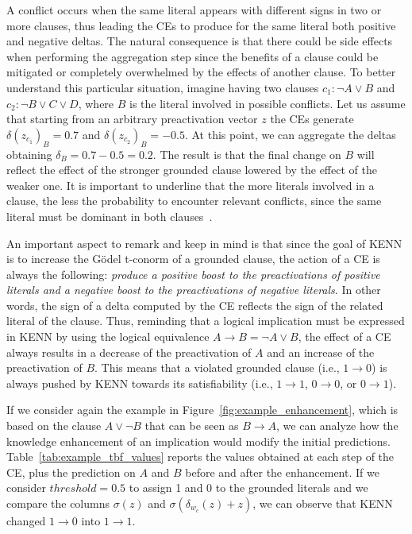 A conflict occurs when the same literal appears with different signs in two or more clauses, thus leading the CEs to produce for the same literal both positive and negative deltas. The natural consequence is that there could be side effects when performing the aggregation step since the benefits of a clause could be mitigated or completely overwhelmed by the effects of another clause. To better understand this particular situation, imagine having two clauses $ c_{1}: \neg A \vee B $ and $ c_{2}: \neg B \vee C \vee D $, where $B$ is the literal involved in possible conflicts. Let us assume that starting from an arbitrary preactivation vector $ z $ the CEs generate $ \delta (z_{c_{1}})_{B} = 0.7 $ and $ \delta (z_{c_{2}})_{B} = -0.5 $. At this point, we can aggregate the deltas obtaining $\delta _{B} = 0.7 - 0.5 = 0.2$. The result is that the final change on $ B $ will reflect the effect of the stronger grounded clause lowered by the effect of the weaker one. It is important to underline that the more literals involved in a clause, the less the probability to encounter relevant conflicts, since the same literal must be dominant in both clauses~\cite{kenn}.

An important aspect to remark and keep in mind is that since the goal of KENN is to increase the Gödel t-conorm of a grounded clause, the action of a CE is always the following: \textit{produce a positive boost to the preactivations of positive literals and a negative boost to the preactivations of negative literals}. In other words, the sign of a delta computed by the CE reflects the sign of the related literal of the clause. Thus, reminding that a logical implication must be expressed in KENN by using the logical equivalence $ A \to B = \neg A \vee B $, the effect of a CE always results in a decrease of the preactivation of $A$ and an increase of the preactivation of $B$. This means that a violated grounded clause (i.e., $ 1 \to 0 $) is always pushed by KENN towards its satisfiability (i.e., $ 1 \to 1 $, $ 0 \to 0 $, or $ 0 \to 1 $).

If we consider again the example in Figure~\ref{fig:example_enhancement}, which is based on the clause $A \vee \neg B $ that can be seen as $ B \to A $, we can analyze how the knowledge enhancement of an implication would modify the initial predictions. Table~\ref{tab:example_tbf_values} reports the values obtained at each step of the CE, plus the prediction on $A$ and $B$ before and after the enhancement. If we consider $ threshold = 0.5 $ to assign 1 and 0 to the grounded literals and we compare the columns $ \sigma (z) $ and $ \sigma (\delta _{w_{c}}(z)+ z)$, we can observe that KENN changed $1 \to 0$ into $1 \to 1$.

